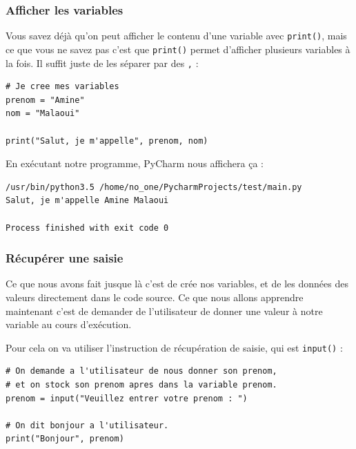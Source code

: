 \documentclass[12pt]{article}
\newcommand{\code}[1]{\colorbox{light-gray}{\texttt{#1}}}
\begin{document}
        \subsubsection{Afficher les variables}
            Vous savez déjà qu'on peut afficher le contenu d'une variable avec \code{print()}, mais ce que vous 
            ne savez pas c'est que \code{print()} permet d'afficher plusieurs variables à la fois. Il suffit 
            juste de les séparer par des \code{,} :
            \begin{lstlisting}[style=code]
# Je cree mes variables
prenom = "Amine"
nom = "Malaoui"

print("Salut, je m'appelle", prenom, nom)
            \end{lstlisting}

            En exécutant notre programme, PyCharm nous affichera ça :

            \begin{lstlisting}[style=exec_result]
/usr/bin/python3.5 /home/no_one/PycharmProjects/test/main.py
Salut, je m'appelle Amine Malaoui

Process finished with exit code 0
            \end{lstlisting}

        \subsubsection{Récupérer une saisie}
            Ce que nous avons fait jusque là c'est de crée nos variables, et de les données des valeurs directement dans
            le code source. Ce que nous allons apprendre maintenant c'est de demander de l'utilisateur 
            de donner une valeur à notre variable au cours d'exécution.

            Pour cela on va utiliser l'instruction de récupération de saisie, qui est \code{input()} : 
            \begin{lstlisting}[style=code]
# On demande a l'utilisateur de nous donner son prenom,
# et on stock son prenom apres dans la variable prenom.
prenom = input("Veuillez entrer votre prenom : ")

# On dit bonjour a l'utilisateur.
print("Bonjour", prenom)
            \end{lstlisting}
\end{document}
